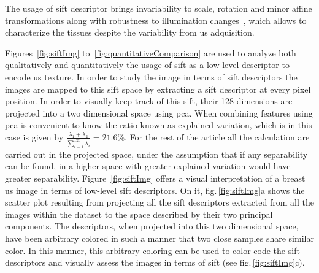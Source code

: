 \documentclass[a4paper, 10pt, conference]{llncs}      %
\begin{document}

The usage of \ac{sift} descriptor brings invariability to scale, rotation and minor affine transformations along with robustness to illumination changes~\cite{lowe2004distinctive}, which allows to characterize the tissues despite the variability from \ac{us} adquisition.



Figures~\ref{fig:siftImg} to~\ref{fig:quantitativeComparison} are used to analyze both qualitatively and quantitatively the usage of \ac{sift} as a low-level descriptor to encode \ac{us} texture. In order to study the image in terms of \ac{sift} descriptors the images are mapped to this \ac{sift} space by extracting a \ac{sift} descriptor at every pixel position. In order to visually keep track of this \ac{sift}, their 128 dimensions are projected into a two dimensional space using \ac{pca}. When combining features using \ac{pca} is convenient to know the ratio known as explained variation, which is in this case is given by $\frac{\lambda_1+\lambda_2}{\sum_{i=1}^{128}\lambda_i}=21.6\%$. %
For the rest of the article all the calculation are carried out in the projected space, under the assumption that if any separability can be found, in a higher space with greater explained variation would have greater separability.
Figure~\ref{fig:siftImg} offers a visual interpretation of a breast \ac{us} image in terms of low-level \ac{sift} descriptors. On it, fig.\,\ref{fig:siftImg}a shows the scatter plot resulting from projecting all the \ac{sift} descriptors extracted from all the images within the dataset to the space described by their two principal components.
The descriptors, when projected into this two dimensional space, have 
been arbitrary colored in such a manner that two close samples share similar color. In this manner, this arbitrary coloring can be used to color code the \ac{sift} descriptors and visually assess the images in terms of \ac{sift} (see fig.\,\ref{fig:siftImg}c).
\end{document}
